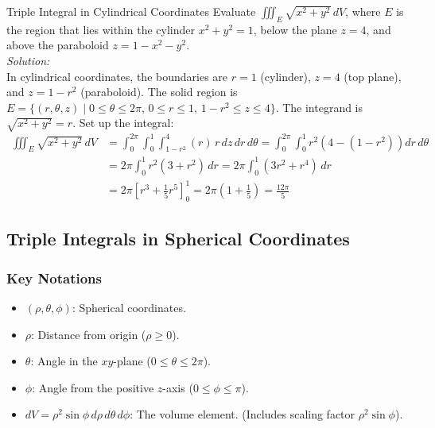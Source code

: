 \documentclass[11pt]{article}
\begin{document}
\begin{examplebox}{Triple Integral in Cylindrical Coordinates}
    Evaluate $\iiint_E \sqrt{x^2+y^2}\,dV$, where $E$ is the region that lies within the cylinder $x^2 + y^2 = 1$, below the plane $z = 4$, and above the paraboloid $z = 1 - x^2 - y^2$.\\
    \textit{Solution:}\\
    In cylindrical coordinates, the boundaries are $r=1$ (cylinder), $z=4$ (top plane), and $z=1-r^2$ (paraboloid).
    The solid region is $E = \{(r,\theta,z) \mid 0 \le \theta \le 2\pi, \, 0 \le r \le 1, \, 1-r^2 \le z \le 4\}$.
    The integrand is $\sqrt{x^2+y^2} = r$.
    Set up the integral:
    \begin{align*}
        \iiint_E \sqrt{x^2+y^2}\,dV &= \int_0^{2\pi} \int_0^1 \int_{1-r^2}^4 (r) \, r\,dz\,dr\,d\theta = \int_0^{2\pi} \int_0^1 r^2 \left( 4 - (1-r^2) \right) dr\,d\theta \\
        &= 2\pi \int_0^1 r^2(3+r^2)\,dr = 2\pi \int_0^1 (3r^2 + r^4)\,dr \\
        &= 2\pi \left[ r^3 + \frac{1}{5}r^5 \right]_0^1 = 2\pi\left(1 + \frac{1}{5}\right) = \frac{12\pi}{5}
    \end{align*}
\end{examplebox}


\subsection{Triple Integrals in Spherical Coordinates}
\subsubsection*{Key Notations}
\begin{itemize}
    \item $(\rho, \theta, \phi)$: Spherical coordinates.
    \item $\rho$: Distance from origin ($\rho \ge 0$).
    \item $\theta$: Angle in the $xy$-plane ($0 \le \theta \le 2\pi$).
    \item $\phi$: Angle from the positive $z$-axis ($0 \le \phi \le \pi$).
    \item $dV = \rho^2\sin\phi\,d\rho\,d\theta\,d\phi$: The volume element. (Includes scaling factor $\rho^2\sin\phi$).
\end{itemize}
\end{document}
